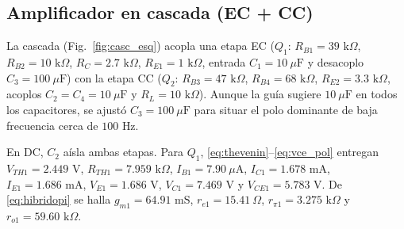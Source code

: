 \documentclass[conference]{IEEEtran}
\begin{document}
\subsection{Amplificador en cascada (EC + CC)}

La cascada (Fig.~\ref{fig:casc_esq}) acopla una etapa EC ($Q_1$: $R_{B1} = 39\text{ k}\Omega$, $R_{B2} = 10\text{ k}\Omega$, $R_C = 2.7\text{ k}\Omega$, $R_{E1} = 1\text{ k}\Omega$, entrada $C_1 = 10\ \mu\text{F}$ y desacoplo $C_3 = 100\ \mu\text{F}$) con la etapa CC ($Q_2$: $R_{B3} = 47\text{ k}\Omega$, $R_{B4} = 68\text{ k}\Omega$, $R_{E2} = 3.3\text{ k}\Omega$, acoplos $C_2 = C_4 = 10\ \mu\text{F}$ y $R_L = 10\text{ k}\Omega$). Aunque la gu\'ia sugiere $10\ \mu\text{F}$ en todos los capacitores, se ajust\'o $C_3 = 100\ \mu\text{F}$ para situar el polo dominante de baja frecuencia cerca de $100\text{ Hz}$.

En DC, $C_2$ a\'isla ambas etapas. Para $Q_1$, \eqref{eq:thevenin}--\eqref{eq:vce_pol} entregan $V_{TH1} = 2.449\text{ V}$, $R_{TH1} = 7.959\text{ k}\Omega$, $I_{B1} = 7.90\ \mu\text{A}$, $I_{C1} = 1.678\text{ mA}$, $I_{E1} = 1.686\text{ mA}$, $V_{E1} = 1.686\text{ V}$, $V_{C1} = 7.469\text{ V}$ y $V_{CE1} = 5.783\text{ V}$. De \eqref{eq:hibridopi} se halla $g_{m1} = 64.91\text{ mS}$, $r_{e1} = 15.41\ \Omega$, $r_{\pi 1} = 3.275\text{ k}\Omega$ y $r_{o1} = 59.60\text{ k}\Omega$.
\end{document}
